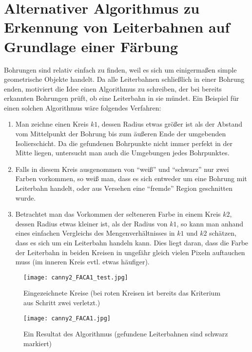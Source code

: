\section{Alternativer Algorithmus zu Erkennung von Leiterbahnen auf Grundlage einer Färbung}
Bohrungen sind relativ einfach zu finden, weil es sich um einigermaßen simple geometrische Objekte handelt. Da alle Leiterbahnen schließlich in einer Bohrung enden, motiviert die Idee einen Algorithmus zu schreiben, der bei bereits erkannten Bohrungen prüft, ob eine Leiterbahn in sie mündet.\newline
Ein Beispiel für einen solchen Algorithmus wäre folgendes Verfahren: \newline
\begin{enumerate}
\item Man zeichne einen Kreis $k1$, dessen Radius etwas größer ist als der Abstand vom Mittelpunkt der Bohrung bis zum äußeren Ende der umgebenden Isolierschicht. \newline
Da die gefundenen Bohrpunkte nicht immer perfekt in der Mitte liegen, untersucht man auch die Umgebungen jedes Bohrpunktes.
\item Falls in diesem Kreis ausgenommen von “weiß” und “schwarz” nur zwei Farben vorkommen, so weiß man, dass es sich entweder um eine Bohrung mit Leiterbahn handelt, oder aus Versehen eine “fremde” Region geschnitten wurde. 
\item Betrachtet man das Vorkommen der selteneren Farbe in einem Kreis $k2$, dessen Radius etwas kleiner ist, als der Radius von $k1$, so kann man anhand eines einfachen Vergleichs des Mengenverhältnisses in $k1$ und $k2$ schätzen, dass es sich um ein Leiterbahn handeln kann. \newline
Dies liegt daran, dass die Farbe der Leiterbahn in beiden Kreisen in ungefähr gleich vielen Pixeln auftauchen muss (im inneren Kreis evtl. etwas häufiger).
\end{enumerate}

\begin{figure}[H]
  \begin{center}
    \texttt{[image: canny2\_FACA1\_test.jpg]}
    \caption{Eingezeichnete Kreise (bei roten Kreisen ist bereits das Kriterium aus Schritt zwei verletzt.)}
    \label{fig:l_alg_1_test}
  \end{center}
\end{figure}

\begin{figure}[H]
  \begin{center}
    \texttt{[image: canny2\_FACA1.jpg]}
    \caption{Ein Resultat des Algorithmus (gefundene Leiterbahnen sind schwarz markiert)}
    \label{fig:l_alg_1}
  \end{center}
\end{figure}

